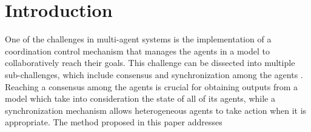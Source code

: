 \section{Introduction}
\label{section:introduction}

One of the challenges in multi-agent systems is the implementation of
a coordination control mechanism that manages the agents in a model to
collaboratively reach their goals. This challenge can be dissected
into multiple sub-challenges, which include consensus and
synchronization among the agents \cite{dorri2018multi}. Reaching a
consensus among the agents is crucial for obtaining outputs from a
model which take into consideration the state of all of its agents,
while a synchronization mechanism allows heterogeneous agents to take
action when it is appropriate. The method proposed in this paper
addresses

